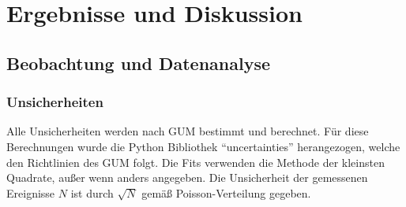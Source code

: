 \documentclass[
	a4paper,
	12pt,
	pagesize,
	ngerman
]{scrartcl}
\begin{document}
	\section{Ergebnisse und Diskussion}


	\subsection{Beobachtung und Datenanalyse}

	\subsubsection{Unsicherheiten}
	Alle Unsicherheiten werden nach GUM bestimmt und berechnet.
	Für diese Berechnungen wurde die Python Bibliothek \enquote{uncertainties} herangezogen, welche den Richtlinien des GUM folgt.
	Die Fits verwenden die Methode der kleinsten Quadrate, außer wenn anders angegeben.
	Die Unsicherheit der gemessenen Ereignisse $N$ ist durch $\sqrt{N}$ gemäß Poisson-Verteilung gegeben.
\end{document}
